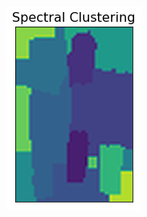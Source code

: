 \documentclass[12pt]{extarticle}
\begin{document}
\begin{figure}[!h]
\begin{subfigure}[b]{0.19\textwidth}
        \includegraphics[width=\textwidth]{spectral_compared.png}
        \caption{}
        \label{fig:f4}
      \end{subfigure}
      \hfill
      \begin{subfigure}[b]{0.19\textwidth}

\end{subfigure}
\end{figure}
\end{document}

